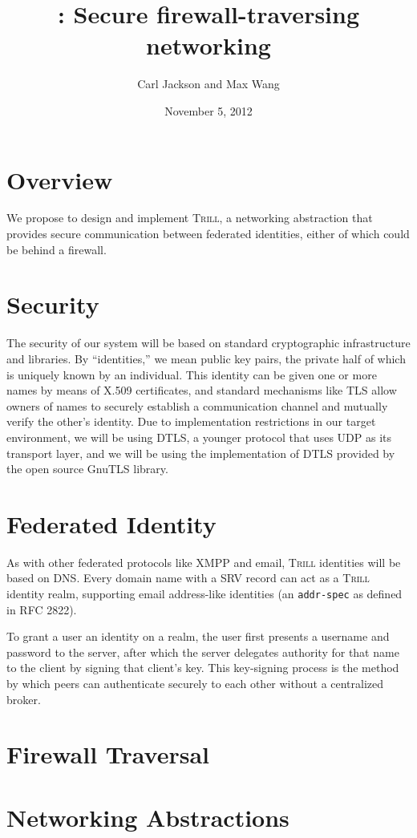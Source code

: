 \documentclass[12pt]{article}
\title{\Trill: Secure firewall-traversing networking}
\author{Carl Jackson and Max Wang}
\date{November 5, 2012}
\makeatletter
\newcommand{\Trill}{\textsc{Trill}\xspace}
\renewcommand{\maketitle}{%
  \thispagestyle{plain}%
  \begin{center}%
    {\LARGE \@title \par}%
    {\large \@author \par}%
    {\large \@date \par}%
  \end{center}%
}
\makeatother
\begin{document}
\maketitle

\section*{Overview}
We propose to design and implement \Trill, a networking abstraction that
provides secure communication between federated identities, either of which
could be behind a firewall.

\section*{Security}
The security of our system will be based on standard cryptographic
infrastructure and libraries. By ``identities,'' we mean public key pairs, the
private half of which is uniquely known by an individual. This identity can be
given one or more names by means of X.509 certificates, and standard mechanisms
like TLS allow owners of names to securely establish a communication channel
and mutually verify the other's identity. Due to implementation restrictions in
our target environment, we will be using DTLS, a younger protocol that uses UDP
as its transport layer, and we will be using the implementation of DTLS
provided by the open source GnuTLS library.

\section*{Federated Identity}
As with other federated protocols like XMPP and email, \Trill identities will
be based on DNS.  Every domain name with a SRV record can act as a \Trill
identity realm, supporting email address-like identities (an \verb!addr-spec!
as defined in RFC 2822).

To grant a user an identity on a realm, the user first presents a username and
password to the server, after which the server delegates authority for that
name to the client by signing that client's key. This key-signing process is
the method by which peers can authenticate securely to each other without a
centralized broker.

\section*{Firewall Traversal}

\section*{Networking Abstractions}
\end{document}
